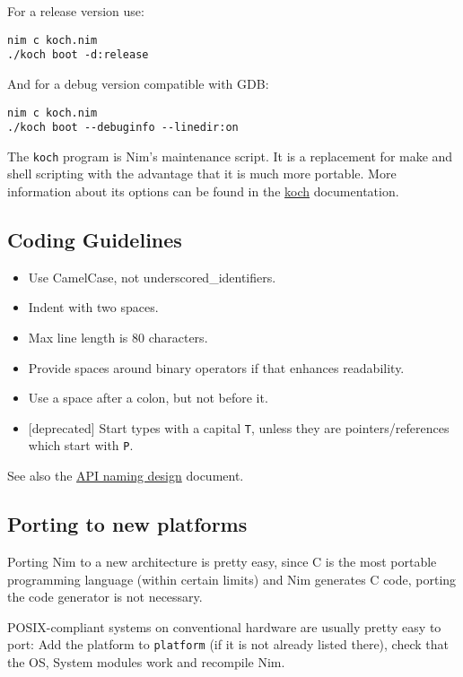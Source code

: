 For a release version use:

\begin{verbatim}
nim c koch.nim
./koch boot -d:release
\end{verbatim}

And for a debug version compatible with GDB:

\begin{verbatim}
nim c koch.nim
./koch boot --debuginfo --linedir:on
\end{verbatim}

The \texttt{koch} program is Nim's maintenance script. It is a
replacement for make and shell scripting with the advantage that it is
much more portable. More information about its options can be found in
the \href{koch.html}{koch} documentation.

\hypertarget{coding-guidelines}{%
\subsection{Coding Guidelines}\label{coding-guidelines}}

\begin{itemize}
\tightlist
\item
  Use CamelCase, not underscored\_identifiers.
\item
  Indent with two spaces.
\item
  Max line length is 80 characters.
\item
  Provide spaces around binary operators if that enhances readability.
\item
  Use a space after a colon, but not before it.
\item
  {[}deprecated{]} Start types with a capital \texttt{T}, unless they
  are pointers/references which start with \texttt{P}.
\end{itemize}

See also the \href{apis.html}{API naming design} document.

\hypertarget{porting-to-new-platforms}{%
\subsection{Porting to new platforms}\label{porting-to-new-platforms}}

Porting Nim to a new architecture is pretty easy, since C is the most
portable programming language (within certain limits) and Nim generates
C code, porting the code generator is not necessary.

POSIX-compliant systems on conventional hardware are usually pretty easy
to port: Add the platform to \texttt{platform} (if it is not already
listed there), check that the OS, System modules work and recompile Nim.

